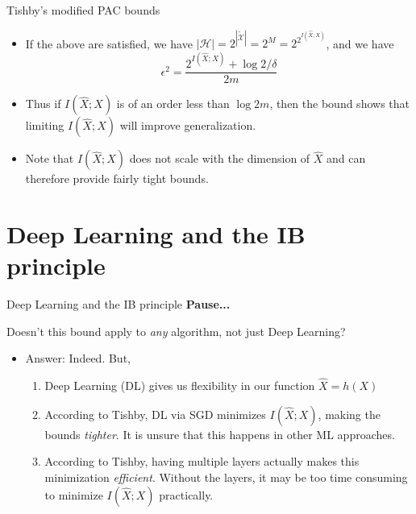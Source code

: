 \documentclass{beamer}
\begin{document}
\begin{frame}{Tishby's modified PAC bounds}
\begin{itemize}
	\item If the above are satisfied, we have $|\mathcal{H}|=2^{|\tilde{\mathcal{X}}|} = 2^{M} = 2^{2^{I(\hat{X};X)}}$, and we have
	\[
	\epsilon^2 = \frac{2^{I(\hat{X};X)} + \log 2/\delta}{2m}
	\]
	\item Thus if $I(\hat{X};X)$ is of an order less than $\log 2m$, then the bound shows that limiting $I(\hat{X};X)$ will improve generalization. 
	\item Note that $I(\hat{X}; X)$ does not scale with the dimension of $\hat{X}$ and can therefore provide fairly tight bounds. 
\end{itemize}
\end{frame}




\section{Deep Learning and the IB principle}
\begin{frame}{Deep Learning and the IB principle}
	\textbf{Pause...} 
	
	Doesn't this bound apply to \emph{any} algorithm, not just Deep Learning? 
	\begin{itemize}
		\item Answer: Indeed. But, 
		\begin{enumerate}
			\item Deep Learning (DL) gives us flexibility in our function $\hat{X}=h(X)$
			\item According to Tishby, DL via SGD minimizes $I(\hat{X}; X)$, making the bounds \emph{tighter}. It is unsure that this happens in other ML approaches. 
			\item According to Tishby, having multiple layers actually makes this minimization \emph{efficient}. Without the layers, it may be too time consuming to minimize $I(\hat{X}; X)$ practically. 
		\end{enumerate} 
	\end{itemize}
\end{frame}
\end{document}
